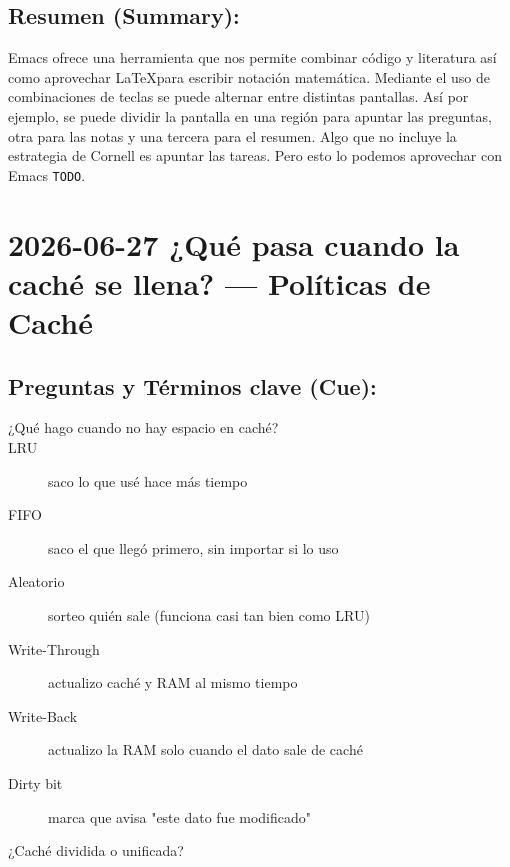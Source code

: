 \documentclass{article}
\begin{document}
\subsection{Resumen (Summary):}
\label{sec:org5788abd}
Emacs ofrece una herramienta que nos permite combinar código y
literatura así como aprovechar \LaTeX para escribir notación
matemática. Mediante el uso de combinaciones de teclas se puede
alternar entre distintas pantallas. Así por ejemplo, se puede dividir
la pantalla en una región para apuntar las preguntas, otra para las
notas y una tercera para el resumen. Algo que no incluye la estrategia
de Cornell es apuntar las tareas. Pero esto lo podemos aprovechar con
Emacs \texttt{TODO}.

\section{2026-06-27 ¿Qué pasa cuando la caché se llena? — Políticas de Caché}
\label{sec:orgc7f6ca1}
\subsection{Preguntas y Términos clave (Cue):}
\label{sec:org2b72067}
\begin{description}
\item[{¿Qué hago cuando no hay espacio en caché?}] 

\item[{LRU}] saco lo que usé hace más tiempo
\item[{FIFO}] saco el que llegó primero, sin importar si lo uso
\item[{Aleatorio}] sorteo quién sale (funciona casi tan bien como LRU)
\item[{Write-Through}] actualizo caché y RAM al mismo tiempo
\item[{Write-Back}] actualizo la RAM solo cuando el dato sale de caché
\item[{Dirty bit}] marca que avisa "este dato fue modificado"
\item[{¿Caché dividida o unificada?}] 
\end{description}
\end{document}
